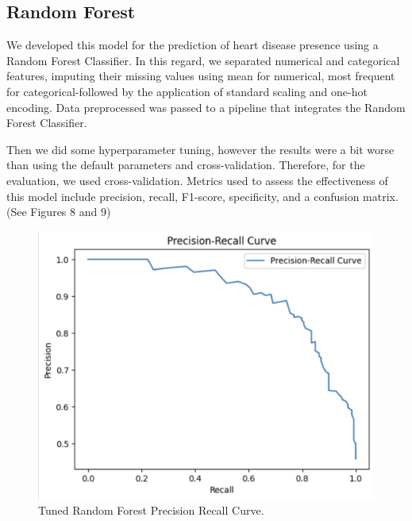 \subsection{Random Forest}
We developed this model for the prediction of heart disease presence using a Random Forest Classifier. In this regard, we separated numerical and categorical features, imputing their missing values using mean for numerical, most frequent for categorical-followed by the application of standard scaling and one-hot encoding. Data preprocessed was passed to a pipeline that integrates the Random Forest Classifier.

Then we did some hyperparameter tuning, however the results were a bit worse than using the default parameters and cross-validation. Therefore, for the evaluation, we used cross-validation. Metrics used to assess the effectiveness of this model include precision, recall, F1-score, specificity, and a confusion matrix. (See Figures 8 and 9)

\begin{figure}[htbp]
    \centerline{\includegraphics[scale=0.2]{img/Random Forest Precision Recall Optimized.png}}
    \caption{Tuned Random Forest Precision Recall Curve.}\label{agedist}
\end{figure}

